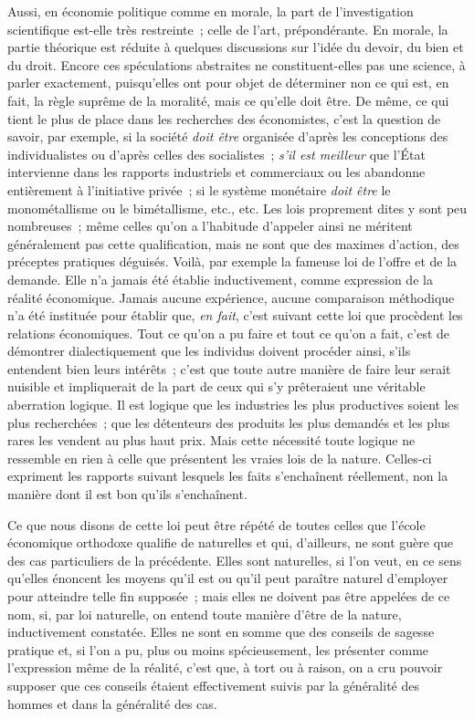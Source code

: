 \documentclass[french,twoside]{book} %
\begin{document}
Aussi, en économie politique comme en morale, la part de l’investigation scientifique est-elle très restreinte ; celle de l’art, prépondérante. En morale, la partie théorique est réduite à quelques discussions sur l’idée du devoir, du bien et du droit. Encore ces spéculations abstraites ne constituent-elles pas une science, à parler exactement, puisqu’elles ont pour objet de déterminer non ce qui est, en fait, la règle suprême de la moralité, mais ce qu’elle doit être. De même, ce qui tient le plus de place dans les recherches des économistes, c’est la question de savoir, par exemple, si la société {\itshape doit être} organisée d’après les conceptions des individualistes ou d’après celles des socialistes ; {\itshape s’il est meilleur} que l’État intervienne dans les rapports industriels et commerciaux ou les abandonne entièrement à l’initiative privée ; si le système monétaire {\itshape doit être} le monométallisme ou le bimétallisme, etc., etc. Les lois proprement dites y sont peu nombreuses ; même celles qu’on a l’habitude d’appeler ainsi ne méritent généralement pas cette qualification, mais ne sont que des maximes d’action, des préceptes pratiques déguisés. Voilà, par exemple la fameuse loi de l’offre et de la demande. Elle n’a jamais été établie inductivement, comme expression de la réalité économique. Jamais aucune expérience, aucune comparaison méthodique n’a été instituée pour établir que, {\itshape en fait}, c’est suivant cette loi que procèdent les relations économiques. Tout ce qu’on a pu faire et tout ce qu’on a fait, c’est de démontrer dialectiquement que les individus doivent procéder ainsi, s’ils entendent bien leurs intérêts ; c’est que toute autre manière de faire leur serait nuisible et impliquerait de la part de ceux qui s’y prêteraient une véritable aberration logique. Il est logique que les industries les plus productives soient les plus recherchées ; que les détenteurs des produits les plus demandés et les plus rares les vendent au plus haut prix. Mais cette nécessité toute logique ne ressemble en rien à celle que présentent les vraies lois de la nature. Celles-ci expriment les rapports suivant lesquels les faits s’enchaînent réellement, non la manière dont il est bon qu’ils s’enchaînent.\par
Ce que nous disons de cette loi peut être répété de toutes celles que l’école économique orthodoxe qualifie de naturelles et qui, d’ailleurs, ne sont guère que des cas particuliers de la précédente. Elles sont naturelles, si l’on veut, en ce sens qu’elles énoncent les moyens qu’il est ou qu’il peut paraître naturel d’employer pour atteindre telle fin supposée ; mais elles ne doivent pas être appelées de ce nom, si, par loi naturelle, on entend toute manière d’être de la nature, inductivement constatée. Elles ne sont en somme que des conseils de sagesse pratique et, si l’on a pu, plus ou moins spécieusement, les présenter comme l’expression même de la réalité, c’est que, à tort ou à raison, on a cru pouvoir supposer que ces conseils étaient effectivement suivis par la généralité des hommes et dans la généralité des cas.\par
\end{document}
